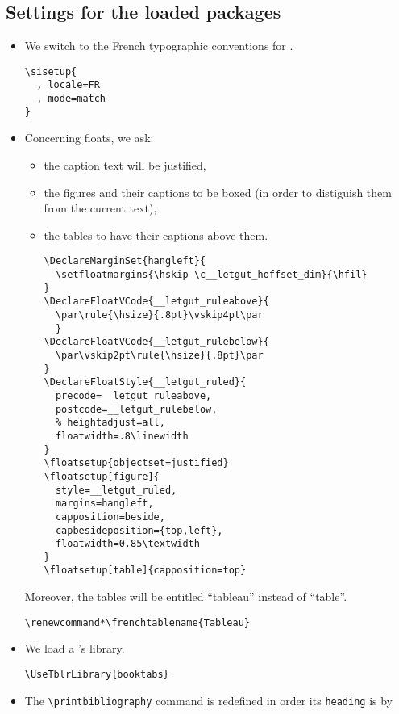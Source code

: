 \documentclass{letgut}
\begin{document}
\subsection{Settings for the loaded packages}
\label{ImplementationSettingsfortheloadedpackages-cdgg55h0jlj0}
\begin{itemize}
\item We switch to the French typographic conventions for .
\begin{lstlisting}
\sisetup{
  , locale=FR
  , mode=match
}
\end{lstlisting}
\item Concerning floats, we ask:
\begin{itemize}
\item the caption text will be justified,
\item the figures and their captions to be boxed (in order to distiguish them from
the current text),
\item the tables to have their captions above them.
\begin{lstlisting}
\DeclareMarginSet{hangleft}{
  \setfloatmargins{\hskip-\c__letgut_hoffset_dim}{\hfil}
}
\DeclareFloatVCode{__letgut_ruleabove}{
  \par\rule{\hsize}{.8pt}\vskip4pt\par
  }
\DeclareFloatVCode{__letgut_rulebelow}{
  \par\vskip2pt\rule{\hsize}{.8pt}\par
}
\DeclareFloatStyle{__letgut_ruled}{
  precode=__letgut_ruleabove,
  postcode=__letgut_rulebelow,
  % heightadjust=all,
  floatwidth=.8\linewidth
}
\floatsetup{objectset=justified}
\floatsetup[figure]{
  style=__letgut_ruled,
  margins=hangleft,
  capposition=beside,
  capbesideposition={top,left},
  floatwidth=0.85\textwidth
}
\floatsetup[table]{capposition=top}
\end{lstlisting}
\end{itemize}
Moreover, the tables will be entitled \enquote{tableau} instead of
\enquote{table}.
\begin{lstlisting}
\renewcommand*\frenchtablename{Tableau}
\end{lstlisting}
\item We load a 's library.
\begin{lstlisting}
\UseTblrLibrary{booktabs}
\end{lstlisting}
\item The \lstinline+\printbibliography+ command is redefined in order its \lstinline+heading+ is by

\end{itemize}
\end{document}

